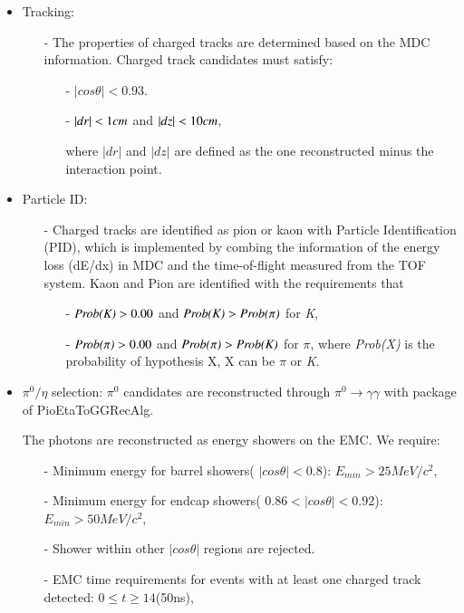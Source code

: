 \begin{itemize}
	\item Tracking:
		\begin{itemize}
			\item[-] The properties of charged tracks are determined based on the MDC information. Charged track candidates must satisfy:
				\begin{itemize}
					\item[-] $|cos\theta| < 0.93$.
					\item[-] $|dr| < \boldmath 1cm$ and $|dz| < \boldmath 10cm$,

						where $|dr|$ and $|dz|$ are defined as the one reconstructed minus the interaction point.
				\end{itemize}
		\end{itemize}
	\item Particle ID:
		\begin{itemize}
			\item[-] Charged tracks are identified as pion or kaon with Particle Identification (PID), which is implemented by combing the information of the energy loss (dE/dx) in MDC and the time-of-flight measured from
				the TOF system. Kaon and Pion are identified with the requirements that 
				\begin{itemize}
					\item[-] $\emph{Prob(K)} > 0.00$ and $\emph{Prob(K)} > \emph{Prob($\pi$)}$ for \emph{K},
					\item[-] $\emph{Prob($\pi$)} > 0.00$ and $\emph{Prob($\pi$)} > \emph{Prob(K)}$ for \emph{$\pi$},
						where \emph{Prob(X)} is the probability of hypothesis X, X can be \emph{$\pi$} or \emph{K}.
				\end{itemize}
		\end{itemize}
	\item $\pi^{0}/\eta$ selection: $\pi^{0}$ candidates are reconstructed through $\pi^{0} \rightarrow \gamma\gamma$ with package of PioEtaToGGRecAlg.
		

		The photons are reconstructed as energy showers on the EMC. We require:
		\begin{itemize}
			\item[-] Minimum energy for barrel showers( $|cos\theta| < 0.8$): $E_{min} >25MeV/c^{2}$,
			\item[-] Minimum energy for endcap showers( $0.86 < |cos\theta| < 0.92$): $E_{min} >50MeV/c^{2}$,
			\item[-] Shower within other $|cos\theta|$ regions are rejected.
			\item[-] EMC time requirements for events with at least one charged track detected: $0 \le t \ge 14 $(50ns),
		\end{itemize}


\end{itemize}
